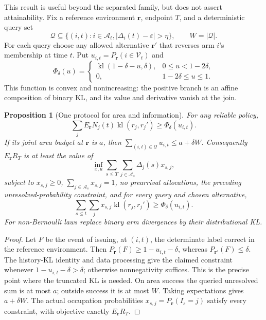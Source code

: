 \documentclass[11pt]{article}
\newtheorem{proposition}[theorem]{Proposition}
\theoremstyle{remark}
\newcommand{\kl}{\operatorname{kl}}
\begin{document}
This result is useful beyond the separated family, but does not assert
attainability. Fix a reference environment $\boldsymbol r$, endpoint $T$, and a
deterministic query set
\[
 \mathcal Q\subseteq\{(i,t):i\in \mathcal{A}_t,
                  |\Delta_i(t)-\varepsilon|>\eta\},\qquad W=|\mathcal Q|.
\]
For each query choose any allowed alternative $\boldsymbol r'$ that reverses arm
$i$'s membership at time $t$. Put $u_{i,t}=P_{\boldsymbol r}(i\in \mathcal V_t)$ and
\[
 \Phi_\delta(u)=
 \begin{cases}
 \kl(1-\delta-u,\delta),&0\le u<1-2\delta,\\
 0,&1-2\delta\le u\le1.
 \end{cases}
\]
This function is convex and nonincreasing: the positive branch is an affine
composition of binary KL, and its value and derivative vanish at the join.

\begin{proposition}[One protocol for area and information]
\label{prop:information}
For any reliable policy,
\[
 \sum_jE_{\boldsymbol r} N_j(t)\kl(r_j,r_j')
                       \ge\Phi_\delta(u_{i,t}).
\]
If its joint area budget at $\boldsymbol r$ is $a$, then
$\sum_{(i,t)\in\mathcal Q}u_{i,t}\le a+\delta W$. Consequently $E_{\boldsymbol r} R_T$
is at least the value of
\[
 \inf_{x,u}\sum_{s\le T}\sum_{j\in \mathcal{A}_s}\Delta_j(s)x_{s,j},
\]
subject to $x_{s,j}\ge0$, $\sum_{j\in \mathcal{A}_s}x_{s,j}=1$, no prearrival
allocations, the preceding unresolved-probability constraint, and for every
query and chosen alternative,
\[
 \sum_{s\le t}\sum_jx_{s,j}\kl(r_j,r_j')
                             \ge\Phi_\delta(u_{i,t}).
\]
For non-Bernoulli laws replace binary arm divergences by their distributional KL.
\end{proposition}
\begin{proof}
Let $F$ be the event of issuing, at $(i,t)$, the determinate label correct in
the reference environment. Then $P_{\boldsymbol r}(F)\ge1-u_{i,t}-\delta$, whereas
$P_{\boldsymbol r'}(F)\le\delta$. The history-KL identity and data processing give
the claimed constraint whenever $1-u_{i,t}-\delta>\delta$; otherwise
nonnegativity suffices. This is the precise point where the truncated KL is
needed. On area success the queried unresolved sum is at most $a$; outside
success it is at most $W$. Taking expectations gives $a+\delta W$.
The actual occupation probabilities $x_{s,j}=P_{\boldsymbol r}(I_s=j)$ satisfy every
constraint, with objective exactly $E_{\boldsymbol r} R_T$.
\end{proof}
\end{document}

